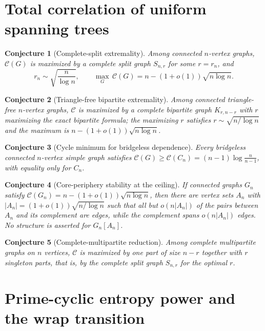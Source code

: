 \documentclass[11pt]{article}
\newtheorem{conjecture}{Conjecture}
\theoremstyle{definition}
\begin{document}
\section{Total correlation of uniform spanning trees}

\begin{conjecture}[Complete-split extremality]\label{ac6}
Among connected $n$-vertex graphs, $\mathcal C(G)$ is maximized by a complete split graph $S_{n,r}$ for some $r=r_n$, and
\[
r_n\sim\sqrt{\frac n{\log n}},\qquad \max_G\,\mathcal C(G)=n-(1+o(1))\sqrt{n\log n}.
\]
\end{conjecture}

\begin{conjecture}[Triangle-free bipartite extremality]\label{ac7}
Among connected triangle-free $n$-vertex graphs, $\mathcal C$ is maximized by a complete bipartite graph $K_{r,n-r}$ with $r$ maximizing the exact bipartite formula; the maximizing $r$ satisfies $r\sim\sqrt{n/\log n}$ and the maximum is $n-(1+o(1))\sqrt{n\log n}$.
\end{conjecture}

\begin{conjecture}[Cycle minimum for bridgeless dependence]\label{ac8}
Every bridgeless connected $n$-vertex simple graph satisfies $\mathcal C(G)\ge\mathcal C(C_n)=(n-1)\log\frac n{n-1}$, with equality only for $C_n$.
\end{conjecture}

\begin{conjecture}[Core-periphery stability at the ceiling]\label{ac9}
If connected graphs $G_n$ satisfy $\mathcal C(G_n)=n-(1+o(1))\sqrt{n\log n}$, then there are vertex sets $A_n$ with $|A_n|=(1+o(1))\sqrt{n/\log n}$ such that all but $o(n|A_n|)$ of the pairs between $A_n$ and its complement are edges, while the complement spans $o(n|A_n|)$ edges.  No structure is asserted for $G_n[A_n]$.
\end{conjecture}

\begin{conjecture}[Complete-multipartite reduction]\label{ac10}
Among complete multipartite graphs on $n$ vertices, $\mathcal C$ is maximized by one part of size $n-r$ together with $r$ singleton parts, that is, by the complete split graph $S_{n,r}$ for the optimal $r$.
\end{conjecture}

\section{Prime-cyclic entropy power and the wrap transition}
\end{document}
